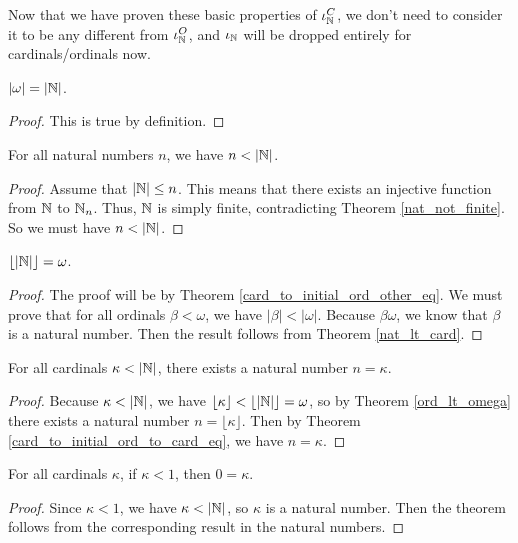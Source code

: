 \documentclass[../../math.tex]{subfiles}
\begin{document}
Now that we have proven these basic properties of $\iota_{\mathbb{N}}^C$, we don't need to
consider it to be any different from $\iota_{\mathbb{N}}^O$, and $\iota_{\mathbb{N}}$ will be dropped entirely
for cardinals/ordinals now.

\begin{theorem} \label{card_omega}
    $|\omega| = |\mathbb{N}|$.
\end{theorem}
\begin{proof}
    This is true by definition.
\end{proof}

\begin{theorem} \label{nat_lt_card}
    For all natural numbers $n$, we have $n < |\mathbb{N}|$.
\end{theorem}
\begin{proof}
    Assume that $|\mathbb{N}| \leq n$.  This means that there exists an injective
    function from $\mathbb{N}$ to $\mathbb{N}_n$.  Thus, $\mathbb{N}$ is simply finite, contradicting
    Theorem \ref{nat_not_finite}.  So we must have $n < |\mathbb{N}|$.
\end{proof}

\begin{theorem} \label{card_omega_initial}
    $\lfloor | \mathbb{N} | \rfloor = \omega$.
\end{theorem}
\begin{proof}
    The proof will be by Theorem \ref{card_to_initial_ord_other_eq}.  We must
    prove that for all ordinals $\beta < \omega$, we have $|\beta| < |\omega|$.
    Because $\beta \omega$, we know that $\beta$ is a natural number.  Then the
    result follows from Theorem \ref{nat_lt_card}.
\end{proof}

\begin{theorem} \label{card_lt_nat}
    For all cardinals $\kappa < |\mathbb{N}|$, there exists a natural number $n =
    \kappa$.
\end{theorem}
\begin{proof}
    Because $\kappa < |\mathbb{N}|$, we have $\lfloor \kappa \rfloor < \lfloor |\mathbb{N}|
    \rfloor = \omega$, so by Theorem \ref{ord_lt_omega} there exists a natural
    number $n = \lfloor \kappa \rfloor$.  Then by Theorem
    \ref{card_to_initial_ord_to_card_eq}, we have $n = \kappa$.
\end{proof}

\begin{theorem} \label{card_lt_one_eq}
    For all cardinals $\kappa$, if $\kappa < 1$, then $0 = \kappa$.
\end{theorem}
\begin{proof}
    Since $\kappa < 1$, we have $\kappa < |\mathbb{N}|$, so $\kappa$ is a natural
    number.  Then the theorem follows from the corresponding result in the
    natural numbers.
\end{proof}
\end{document}

